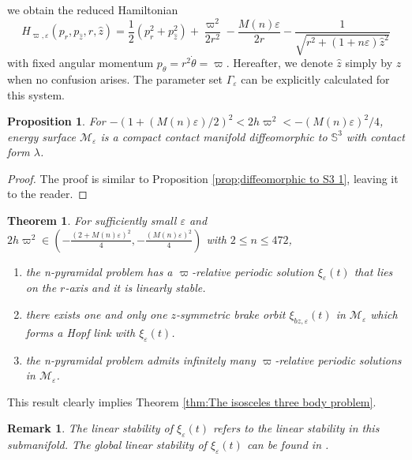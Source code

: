 \documentclass[11pt]{amsart}
\newcommand{\M}{\mathcal M}
\newcommand{\ep}{\varepsilon}
\newcommand{\om}{\varpi}
\newtheorem{thm}{Theorem}[section]
\newtheorem{prop}{Proposition}[section]
\newtheorem{remark}{Remark}[section]
\begin{document}
we obtain the reduced Hamiltonian
\begin{equation}
	H_{\om,\ep}(p_{r},p_{\hat{z}},r,\hat{z}) = \frac{1}{2}(p_{r}^{2} + p_{\hat{z}}^{2}) + \frac{\om^2}{2r^2} - \frac{M(n)\ep}{2r} - \frac{1}{\sqrt{r^{2} + (1+n\ep)\hat{z}^{2}}}
\end{equation}
with fixed angular momentum $p_{\theta}=r^2\dot{\theta}=\om$.
Hereafter, we denote $\hat{z}$ simply by $z$ when no confusion arises. The parameter set $\Gamma_\ep$ can be explicitly calculated for this system.
\begin{prop}
	For $-(1+(M(n)\ep)/2)^2<2h\om^2<-(M(n)\ep)^2/4$, energy surface $\mathcal{M}_\ep$ is a compact contact manifold diffeomorphic to $\mathbb{S}^{3}$ with contact form $\lambda$.
\end{prop}
\begin{proof}
	The proof is similar to Proposition \ref{prop;diffeomorphic to S3 1}, leaving it to the reader.
\end{proof}
\begin{thm}
	For sufficiently small $\ep$ and $2h\om^2\in(-\frac{(2+M(n)\ep)^2}{4},-\frac{(M(n)\ep)^2}{4})$ with $2\leq n\leq 472$,
	\begin{enumerate}
		\item[(a)] the n-pyramidal problem has a $\om$-relative periodic solution $\xi_{\ep}(t)$ that lies on the $r$-axis and it is linearly stable. 
		\item[(b)] there exists one and only one $z$-symmetric brake orbit $\xi_{bz,\ep}(t)$ in $\M_\ep$ which forms a Hopf link with $\xi_{\ep}(t)$.
		\item[(c)] the n-pyramidal problem admits infinitely many $\om$-relative periodic solutions in $\M_\ep$.
	\end{enumerate}
\end{thm}
This result clearly implies Theorem \ref{thm:The isosceles three body problem}.
\begin{remark}
	The linear stability of $\xi_{\ep}(t)$ refers to the linear stability in this submanifold. The global linear stability of  $\xi_{\ep}(t)$ can be found in \cite{Moe92,HLO20,HOT23,OS23}.
\end{remark}
\end{document}
